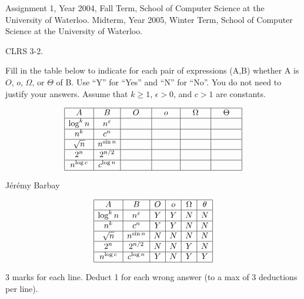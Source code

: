 \begin{usage}
Assignment 1, Year 2004, Fall Term, School of Computer Science at the University of Waterloo.
Midterm, Year 2005, Winter Term, School of Computer Science at the University of Waterloo.
\end{usage}
\begin{authorship}
CLRS 3-2.
\end{authorship}
Fill in the table below to indicate
for each pair of expressions (A,B)
whether A is $O$, $o$, $\Omega$, or $\Theta$ of B.
Use ``Y'' for ``Yes'' and ``N'' for ``No''.
%
You do not need to justify your answers.
%
Assume that $k \geq 1$, $\epsilon > 0$, and $c > 1$ are
constants.
%
\begin{spaceForAnswer}
\renewcommand{\arraystretch}{2}
\begin{textOnly}
$$
\begin{array}{|c|c|c|c|c|c|}\hline
  A          &	B               &   \ \ \ O\ \ \    &   \ \ \ o\ \ \    & \ \ \ \Omega\ \ \ &\ \ \ \Theta\ \ \  \\ \hline
 \log^{k}n     &n^{\varepsilon }    	&    	&  	&  	&  	\\ \hline
 n^{k}       &	c^{n}              	&   	&  	&  	&  	\\ \hline
 \sqrt{n}    &	n ^{\sin n}        	&   	&  	&  	&  	\\ \hline
 2^{n}       &	2^{n/2}            	&   	&   	&  	&  	\\ \hline
 n^{\log c}   &	c^{\log n}          	&   	&  	&  	&  	\\ \hline
\end{array}
$$
\end{textOnly}
\end{spaceForAnswer}
\begin{solution}
\begin{authorship}J\'er\'emy Barbay\end{authorship}
$$
\begin{array}{|c|c|c|c|c|c|c|}\hline
  A          &	B               &   O   &   o   & \Omega&\theta \\	\hline
 \log^{k}n     &n^{\varepsilon }  &   Y	&   Y 	&  N	&  N	\\	\hline
 n^{k}       &	c^{n}           &   Y	&   Y	&  N	&  N	\\	\hline
 \sqrt{n}    &	n ^{\sin n}     &   N	&   N	&  N	&  N	\\	\hline
 2^{n}       &	2^{n/2}         &   N 	&   N	&  Y 	&  N	\\	\hline
 n^{\log c}   &	c^{\log n}       &   Y	&   N	&  Y	&  Y	\\	\hline
\end{array}
$$
\end{solution}
\begin{markingScheme}
3 marks for each line.  Deduct 1 for each wrong answer (to a max of
3 deductions per line).
\end{markingScheme}
